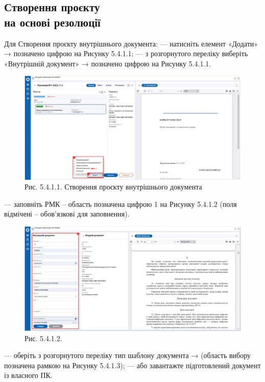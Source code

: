 \subsection{Створення проєкту \\ на основі резолюції}

Для Створення проєкту внутрішнього документа:
--- натисніть елемент «Додати» → позначено цифрою  на Рисунку 5.4.1.1;
--- з розгорнутого переліку  виберіть «Внутрішній документ» → позначено цифрою  на Рисунку 5.4.1.1.

\begin{figure}[!htbp]
\centerline{\includegraphics[width=\textwidth]{img/5.4.1.1.png}}
\caption{Рис. 5.4.1.1. Створення проєкту внутрішнього документа}
\end{figure}


--- заповніть РМК – область позначена цифрою 1 на Рисунку 5.4.1.2 (поля
відмічені \circled{$\ast$} – обов’язкові для заповнення).

\begin{figure}[!htbp]
\centerline{\includegraphics[width=\textwidth]{img/5.4.1.2.png}}
\caption{Рис. 5.4.1.2. }
\end{figure}

--- оберіть з розгорнутого переліку тип шаблону документа → (область вибору позначена рамкою на Рисунку 5.4.1.3);
--- або завантажте підготовлений документ із власного ПК.

